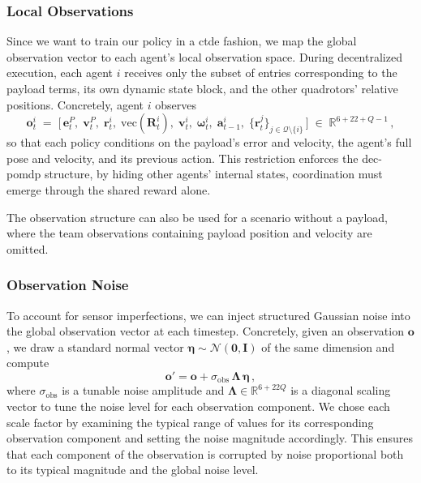 \subsubsection{Local Observations}
Since we want to train our policy in a \gls{ctde} fashion, we map the global observation vector to each agent's local observation space. During decentralized execution, each agent \(i\) receives only the subset of entries corresponding to the payload terms, its own dynamic state block, and the other quadrotors' relative positions. Concretely, agent \(i\) observes
\begin{equation}
\mathbf{o}^i_t 
\;=\;
\bigl[\,
\mathbf{e}^P_t,\;\mathbf{v}^P_t,\;\mathbf{r}^i_t,\;\mathrm{vec}(\mathbf{R}^i_t),\;\mathbf{v}^i_t,\;\boldsymbol{\omega}^i_t,\;\mathbf{a}^i_{t-1},\;
\{\mathbf{r}^j_t\}_{j \in \mathcal{Q}\setminus\{i\}}
\,\bigr]\;\in\;\mathbb{R}^{6 + 22 + Q - 1}\,,
\end{equation}
so that each policy conditions on the payload's error and velocity, the agent's full pose and velocity, and its previous action. This restriction enforces the \gls{dec-pomdp} structure, by hiding other agents' internal states, coordination must emerge through the shared reward alone.

The observation structure can also be used for a scenario without a payload, where the team observations containing payload position and velocity are omitted.
\subsubsection{Observation Noise}
To account for sensor imperfections, we can inject structured Gaussian noise into the global observation vector at each timestep. Concretely, given an observation $\mathbf{o}$, we draw a standard normal vector $\bm{\eta}\sim\mathcal{N}(\mathbf{0},\mathbf{I})$ of the same dimension and compute
\begin{equation}
    \mathbf{o}' = \mathbf{o} + \sigma_{\mathrm{obs}}\,\bm{\Lambda}\,\bm{\eta}\,,
\end{equation}
where $\sigma_{\mathrm{obs}}$ is a tunable noise amplitude and $\bm{\Lambda}\in\mathbb{R}^{6+22Q}$ is a diagonal scaling vector to tune the noise level for each observation component. We chose each scale factor by examining the typical range of values for its corresponding observation component and setting the noise magnitude accordingly. This ensures that each component of the observation is corrupted by noise proportional both to its typical magnitude and the global noise level.
